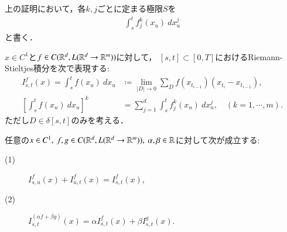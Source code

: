 上の証明において，各$k,j$ごとに定まる極限$S$を
\begin{align}
	\int_s^t f^k_j(x_u)\ dx^j_u
\end{align}
と書く．

\begin{screen}
	\begin{dfn}[$C^1$-級のパスに対する汎関数]
		$x \in C^1$と$f \in C(\mathbb{R}^d,L(\mathbb{R}^d \rightarrow \mathbb{R}^m))$に対して，
		$[s,t] \subset [0,T]$におけるRiemann-Stieltjes積分を次で表現する:
		\begin{align}
			I^f_{s,t}(x) = \int_s^t f(x_u)\ dx_u 
			&\coloneqq \lim_{|D| \to 0}
				\sum_{D} f(x_{t_{i-1}})(x_{t_i} - x_{t_{i-1}}), \\
			\left[ \int_s^t f(x_u)\ dx_u \right]^k
			&= \sum_{j=1}^d \int_s^t f^k_j(x_u)\ dx^j_u,
			\quad (k = 1,\cdots,m).
		\end{align}
		ただし$D \in \delta[s,t]$のみを考える．
	\end{dfn}
\end{screen}

\begin{screen}
	\begin{thm}
	\label{thm:linearity_of_Riemann_Stieltjes_integral}
		任意の$x \in C^1,\ f,g \in C(\mathbb{R}^d,L(\mathbb{R}^d \rightarrow \mathbb{R}^m)),\ \alpha,\beta \in \mathbb{R}$に対して次が成立する:
		\begin{description}
			\item[(1)] $I^f_{s,u}(x) + I^f_{u,t}(x) = I^f_{s,t}(x)$,
			
			\item[(2)] $I^{(\alpha f + \beta g)}_{s,t}(x) = \alpha I^f_{s,t}(x) + \beta I^g_{s,t}(x)$.
		\end{description}
	\end{thm}
\end{screen}

